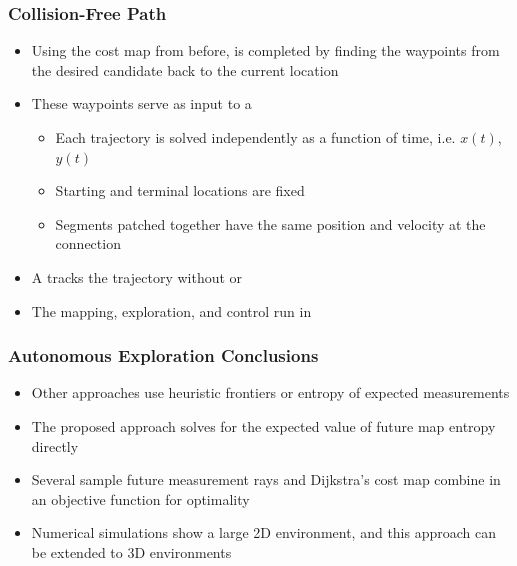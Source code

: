 \documentclass[11pt,professionalfonts,hyperref={pdftex,pdfpagemode=none,pdfstartview=FitH}]{beamer}
\renewcommand{\emph}[1]{\textit{\textbf{\color{blue}{#1}}}}
\begin{document}
\begin{frame}
\frametitle{Collision-Free Path}

\begin{itemize}
	\item Using the cost map from before, \emph{Dijkstra's algorithm} is completed by finding the waypoints from the desired candidate back to the current location
	\vspace*{0.0cm}\pause
	\item These waypoints serve as input to a \emph{constrained polynomial least squares trajectory}
	\begin{itemize}
		\item Each trajectory is solved independently as a function of time, i.e. $x(t)$, $y(t)$
		\item Starting and terminal locations are fixed
		\item Segments patched together have the same position and velocity at the connection
	\end{itemize}
	\vspace*{0.0cm}\pause
	\item A \emph{geometric controller} tracks the trajectory without \emph{singularities} or \emph{ambiguities}
	\vspace*{0.0cm}\pause
	\item The mapping, exploration, and control run in \emph{real-time}
\end{itemize}

\end{frame}





\begin{frame}
\frametitle{Autonomous Exploration Conclusions}

\begin{itemize}
	\item Other approaches use heuristic frontiers or entropy of expected measurements
	\item The proposed approach solves for the expected value of future map entropy directly
	\item Several sample future measurement rays and Dijkstra's cost map combine in an objective function for optimality
	\item Numerical simulations show a large 2D environment, and this approach can be extended to 3D environments
\end{itemize}

\end{frame}
\end{document}
